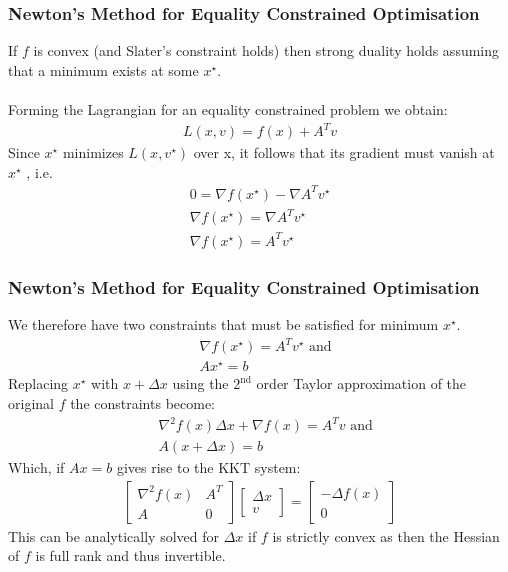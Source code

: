 \documentclass{beamer}
\begin{document}
\begin{frame}
    \frametitle{Newton's Method for Equality Constrained Optimisation}
    If $f$ is convex (and Slater's constraint holds) then strong duality holds
    assuming that a minimum exists at some $x^{\star}$.
    \\~\\
    Forming the Lagrangian for an equality constrained problem we
    obtain:
    \begin{align*}
        L(x, v) = f(x) + A^{T}v
    \end{align*}
    Since $x^{\star}$ minimizes $L(x, v^{\star} )$ over x, it follows that
    its gradient must vanish at $x^{\star}$ , i.e.
    \begin{align*}
        0 = \nabla f(x^{\star}) -  \nabla A^{T}v^{\star} \\
        \nabla f(x^{\star}) = \nabla A^{T}v^{\star} \\
        \nabla f(x^{\star}) = A^{T} v^{\star}
    \end{align*}
\end{frame}

\begin{frame}
    \frametitle{Newton's Method for Equality Constrained Optimisation}
    We therefore have two constraints that must be satisfied for minimum
    $x^{\star}$.
    \begin{align*}
        &\nabla f(x^{\star}) = A^{T} v^{\star} \text{ and} \\
        &A x^{\star} = b
    \end{align*}
    Replacing $x^{\star}$ with $x + \Delta x$ using the $2^{\text{nd}}$ order
    Taylor approximation of the original $f$ the constraints become:
    \begin{align*}
        &\nabla^{2}f(x)\Delta x + \nabla f(x) = A^{T}v \text{ and}\\
        &A(x + \Delta x) = b
    \end{align*}
    Which, if $Ax = b$ gives rise to the KKT system:
    \begin{align*}
        \begin{bmatrix}
            \nabla^{2}f(x) & A^{T} \\
            A & 0
        \end{bmatrix}
        \begin{bmatrix}
            \Delta x \\
            v
        \end{bmatrix}
        =
        \begin{bmatrix}
            -\Delta f(x) \\
            0
        \end{bmatrix}
    \end{align*}
    This can be analytically solved for $\Delta x$ if $f$ is strictly convex as
    then the Hessian of $f$ is full rank and thus invertible.
\end{frame}
\end{document}
